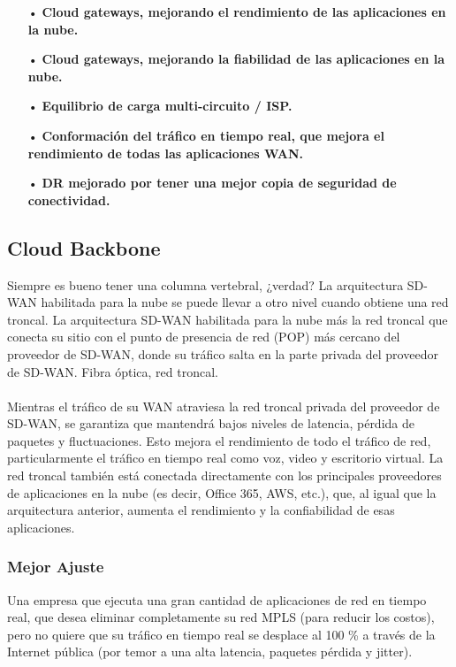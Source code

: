 \begin{itemize}
\item[•] \textbf{Cloud gateways, mejorando el rendimiento de las aplicaciones en la nube.}
\item[•] \textbf{Cloud gateways, mejorando la fiabilidad de las aplicaciones en la nube.}
\item[•] \textbf{Equilibrio de carga multi-circuito / ISP.}
\item[•] \textbf{Conformación del tráfico en tiempo real, que mejora el rendimiento de todas las aplicaciones WAN.}
\item[•] \textbf{DR mejorado por tener una mejor copia de seguridad de conectividad.}
\end{itemize}

\subsection{Cloud Backbone}
\label{sec:Cloud Backbone}

Siempre es bueno tener una columna vertebral, ¿verdad? La arquitectura SD-WAN habilitada para la nube se puede llevar a otro nivel cuando obtiene una red troncal. La arquitectura SD-WAN habilitada para la nube más la red troncal que conecta su sitio con el punto de presencia de red (POP) más cercano del proveedor de SD-WAN, donde su tráfico salta en la parte privada del proveedor de SD-WAN. Fibra óptica, red troncal.
\\
\\
Mientras el tráfico de su WAN atraviesa la red troncal privada del proveedor de SD-WAN, se garantiza que mantendrá bajos niveles de latencia, pérdida de paquetes y fluctuaciones.
Esto mejora el rendimiento de todo el tráfico de red, particularmente el tráfico en tiempo real como voz, video y escritorio virtual. La red troncal también está conectada directamente con los principales proveedores de aplicaciones en la nube (es decir, Office 365, AWS, etc.), que, al igual que la arquitectura anterior, aumenta el rendimiento y la confiabilidad de esas aplicaciones.

\subsubsection{Mejor Ajuste}
\label{sec:Mejor Ajuste}
Una empresa que ejecuta una gran cantidad de aplicaciones de red en tiempo real, que desea eliminar completamente su red MPLS (para reducir los costos), pero no quiere que su tráfico en tiempo real se desplace al 100 \% a través de la Internet pública (por temor a una alta latencia, paquetes pérdida y jitter).


